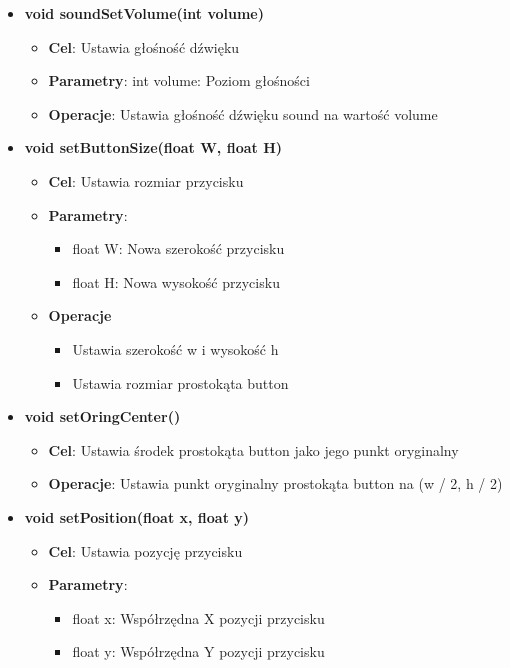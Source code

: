 \documentclass[a4paper, 10pt]{article}
\begin{document}
\begin{itemize}
\begin{itemize}
		\end{itemize}
	\item \textbf{void soundSetVolume(int volume)}
		\begin{itemize}
			\item \textbf{Cel}: Ustawia głośność dźwięku
			\item \textbf{Parametry}: int volume: Poziom głośności
			\item \textbf{Operacje}: Ustawia głośność dźwięku sound na wartość volume
		\end{itemize}
	\item \textbf{void setButtonSize(float W, float H)}
		\begin{itemize}
			\item \textbf{Cel}: Ustawia rozmiar przycisku
			\item \textbf{Parametry}:
				\begin{itemize}
					\item float W: Nowa szerokość przycisku
					\item float H: Nowa wysokość przycisku
				\end{itemize}
			\item \textbf{Operacje}
				\begin{itemize}
					\item Ustawia szerokość w i wysokość h
					\item Ustawia rozmiar prostokąta button
				\end{itemize}
		\end{itemize}
	\item \textbf{void setOringCenter()}
		\begin{itemize}
			\item \textbf{Cel}: Ustawia środek prostokąta button jako jego punkt oryginalny
			\item \textbf{Operacje}: Ustawia punkt oryginalny prostokąta button na (w / 2, h / 2)
		\end{itemize}
	\item \textbf{void setPosition(float x, float y)}
		\begin{itemize}
			\item \textbf{Cel}: Ustawia pozycję przycisku
			\item \textbf{Parametry}:
				\begin{itemize}
					\item float x: Współrzędna X pozycji przycisku
					\item float y: Współrzędna Y pozycji przycisku
				\end{itemize}

\end{itemize}
\end{itemize}
\end{document}
